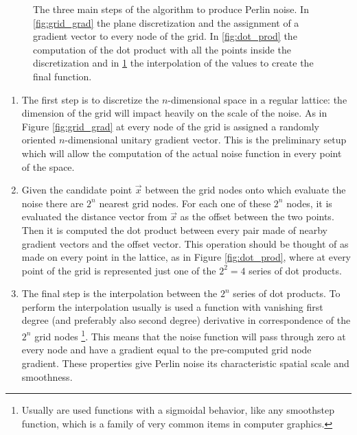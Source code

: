 \documentclass[12pt,a4paper]{report}
\begin{document}
\begin{figure}
\begin{subfigure}[b]{0.3\textwidth}
             \caption{}
             \label{fig:interp}
        \end{subfigure}
        \caption{The three main steps of the algorithm to produce Perlin noise. In \ref{fig:grid_grad} the plane discretization and the assignment of a gradient vector to every node of the grid. In \ref{fig:dot_prod} the computation of the dot product with all the points inside the discretization and in \ref{fig:interp} the interpolation of the values to create the final function.}
        \label{fig:perlin_alg}
    \end{figure}

    \begin{enumerate}
        \item The first step is to discretize the $n$-dimensional space in a regular lattice: the dimension of the grid will impact heavily on the scale of the noise. As in Figure \ref{fig:grid_grad} at every node of the grid is assigned a randomly oriented $n$-dimensional unitary gradient vector. This is the preliminary setup which will allow the computation of the actual noise function in every point of the space.

        \item Given the candidate point $\vec x$ between the grid nodes onto which evaluate the noise there are $2^n$ nearest grid nodes. For each one of these $2^n$ nodes, it is evaluated the distance vector from $\vec x$ as the offset between the two points. Then it is computed the dot product between every pair made of nearby gradient vectors and the offset vector. This operation should be thought of as made on every point in the lattice, as in Figure \ref{fig:dot_prod}, where at every point of the grid is represented just one of the $2^2 = 4$ series of dot products.

        \item The final step is the interpolation between the $2^n$ series of dot products. To perform the interpolation usually is used a function with vanishing first degree (and preferably also second degree) derivative in correspondence of the $2^n$ grid nodes \footnote{Usually are used functions with a sigmoidal behavior, like any smoothstep function, which is a family of very common items in computer graphics.}. This means that the noise function will pass through zero at every node and have a gradient equal to the pre-computed grid node gradient. These properties give Perlin noise its characteristic spatial scale and smoothness.
    \end{enumerate}
\end{document}

